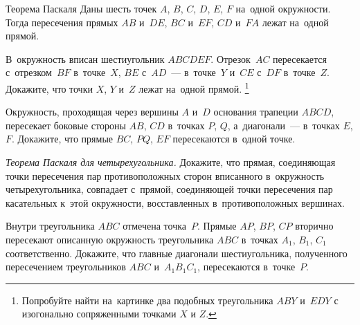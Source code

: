 


\begin{claim}{Теорема Паскаля}
Даны шесть точек $A$, $B$, $C$, $D$, $E$, $F$ на~одной окружности.
Тогда пересечения прямых $AB$ и~$DE$, $BC$ и~$EF$, $CD$ и~$FA$ лежат на~одной
прямой.
\end{claim}

\begin{problems}

\item
В~окружность вписан шестиугольник $ABCDEF$.
Отрезок~$AC$ пересекается с~отрезком~$BF$ в~точке~$X$,
$BE$ с~$AD$~--- в~точке~$Y$ и~$CE$ с~$DF$ в~точке~$Z$.
Докажите, что точки $X$, $Y$ и~$Z$ лежат на~одной прямой.%
\footnote{Попробуйте найти на~картинке два подобных треугольника $ABY$ и~$EDY$
с изогонально сопряженными точками $X$ и $Z$.}


\item
Окружность, проходящая через вершины $A$ и~$D$ основания трапеции $ABCD$,
пересекает боковые стороны $AB$, $CD$ в~точках $P$, $Q$, а~диагонали~---
в~точках $E$, $F$.
Докажите, что прямые $BC$, $PQ$, $EF$ пересекаются в~одной точке.


\item
\emph{Теорема Паскаля для четырехугольника.}
Докажите, что прямая, соединяющая точки пересечения пар противоположных сторон
вписанного в~окружность четырехугольника, совпадает с~прямой, соединяющей точки
пересечения пар касательных к~этой окружности, восставленных в~противоположных
вершинах.

\item
Внутри треугольника $ABC$ отмечена точка~$P$.
Прямые $AP$, $BP$, $CP$ вторично пересекают описанную окружность треугольника
$ABC$ в~точках $A_{1}$, $B_{1}$, $C_{1}$ соответственно.
Докажите, что главные диагонали шестиугольника, полученного пересечением
треугольников $ABC$ и~$A_{1}B_{1}C_{1}$, пересекаются в~точке~$P$.


\end{problems}

